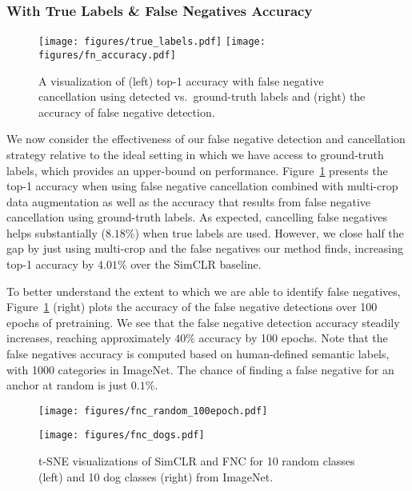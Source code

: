 \documentclass[10pt,twocolumn,letterpaper]{article}
\begin{document}
\subsubsection{With True Labels \& False Negatives Accuracy}
\begin{figure}[!b]
    \vspace{-5pt}
    \centering
    \texttt{[image: figures/true\_labels.pdf]}\hfil
    \texttt{[image: figures/fn\_accuracy.pdf]}    
\caption{A visualization of (left) top-1 accuracy with false negative cancellation using detected vs.\ ground-truth labels and (right) the accuracy of false negative detection.} \label{fig:fn_acc}
\end{figure}
We now consider the effectiveness of our false negative detection and cancellation strategy relative to the ideal setting in which we have access to ground-truth labels, which provides an upper-bound on performance. Figure~\ref{fig:fn_acc} presents the top-1 accuracy when using false negative cancellation combined with multi-crop data augmentation as well as the accuracy that results from false negative cancellation using ground-truth labels. As expected, cancelling false negatives helps substantially ($8.18\%$) when true labels are used. However, we close half the gap by just using multi-crop and the false negatives our method finds, increasing top-1 accuracy by $4.01\%$ over the SimCLR baseline.

To better understand the extent to which we are able to identify false negatives, Figure~\ref{fig:fn_acc} (right) plots the accuracy of the false negative detections over 100 epochs of pretraining. We see that the false negative detection accuracy steadily increases, reaching approximately $40\%$ accuracy by 100 epochs. Note that the false negatives accuracy is computed based on human-defined semantic labels, with 1000 categories in ImageNet. The chance of finding a false negative for an anchor at random is just $0.1\%$.


\begin{figure}[t]
    \vspace{-9pt}
    \hfill
    \begin{minipage}[t]{0.48\linewidth}
        \vspace{0pt}
        \texttt{[image: figures/fnc\_random\_100epoch.pdf]}
    \end{minipage}
    \hfill\vline\hfill
    \begin{minipage}[t]{0.48\linewidth}
        \vspace{0pt}
        \texttt{[image: figures/fnc\_dogs.pdf]}
    \end{minipage}
    \hfill
    \vspace{7pt}
    \caption{t-SNE visualizations of SimCLR and FNC for 10 random classes (left) and 10 dog classes (right) from ImageNet.}
    \label{fig:tsne}
    \vspace{-10pt}
\end{figure}
\end{document}
